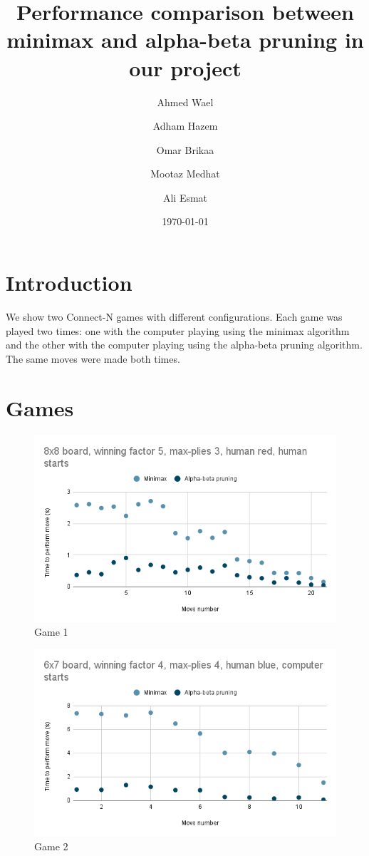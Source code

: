 \documentclass[11pt,a4paper]{article}
\begin{document}
\title{Performance comparison between minimax and alpha-beta pruning in our project}
\author{
    Ahmed Wael \and Adham Hazem \and Omar Brikaa \and Mootaz Medhat \and Ali Esmat
}
\date{\today}
\maketitle

\section{Introduction}
We show two Connect-N games with different configurations.
Each game was played two times:
one with the computer playing using the minimax algorithm
and the other with the computer playing using the alpha-beta pruning algorithm.
The same moves were made both times.

\section{Games}
\begin{figure}
    \includegraphics[width=\textwidth]{minimax-vs-abp-1}
    \caption{Game 1}
    \label{fig:game_1}
\end{figure}

\begin{figure}
    \includegraphics[width=\textwidth]{minimax-vs-abp-2}
    \caption{Game 2}
    \label{fig:game_2}
\end{figure}
\end{document}
